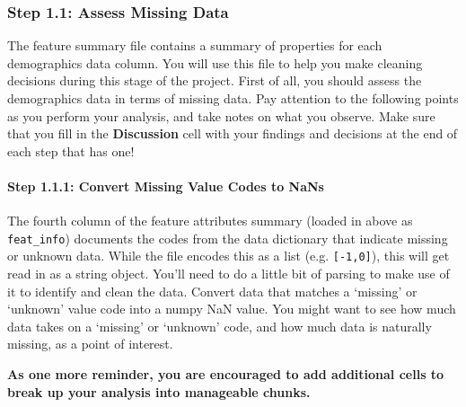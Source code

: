 \documentclass[11pt]{article}
\begin{document}
\hypertarget{step-1.1-assess-missing-data}{%
\subsubsection{Step 1.1: Assess Missing
Data}\label{step-1.1-assess-missing-data}}

The feature summary file contains a summary of properties for each
demographics data column. You will use this file to help you make
cleaning decisions during this stage of the project. First of all, you
should assess the demographics data in terms of missing data. Pay
attention to the following points as you perform your analysis, and take
notes on what you observe. Make sure that you fill in the
\textbf{Discussion} cell with your findings and decisions at the end of
each step that has one!

\hypertarget{step-1.1.1-convert-missing-value-codes-to-nans}{%
\paragraph{Step 1.1.1: Convert Missing Value Codes to
NaNs}\label{step-1.1.1-convert-missing-value-codes-to-nans}}

The fourth column of the feature attributes summary (loaded in above as
\texttt{feat\_info}) documents the codes from the data dictionary that
indicate missing or unknown data. While the file encodes this as a list
(e.g. \texttt{{[}-1,0{]}}), this will get read in as a string object.
You'll need to do a little bit of parsing to make use of it to identify
and clean the data. Convert data that matches a `missing' or `unknown'
value code into a numpy NaN value. You might want to see how much data
takes on a `missing' or `unknown' code, and how much data is naturally
missing, as a point of interest.

\textbf{As one more reminder, you are encouraged to add additional cells
to break up your analysis into manageable chunks.}
\end{document}
